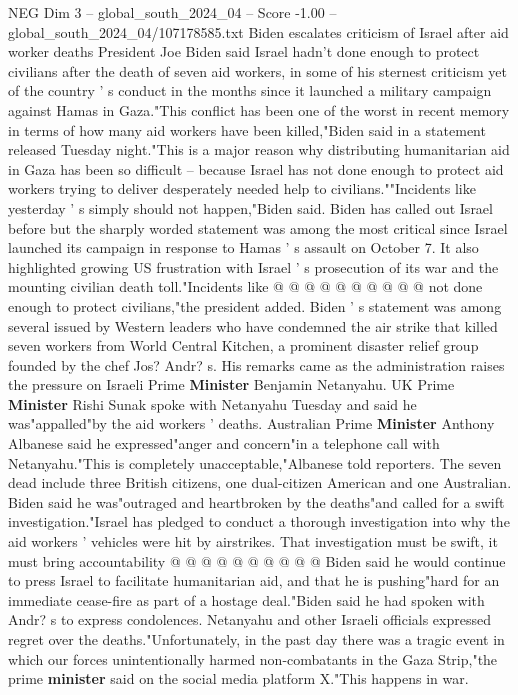 \begin{textsample}{NEG Dim 3 – global\_south\_2024\_04 – Score -1.00 – global\_south\_2024\_04/107178585.txt}  \label{ex:f3_neg_247}
Biden escalates criticism of Israel after aid worker deaths President Joe Biden said Israel hadn't done enough to protect civilians after the death of seven aid workers, in some of his sternest criticism yet of the country ' s conduct in the months since it launched a military campaign against Hamas in Gaza."This conflict has been one of the worst in recent memory in terms of how many aid workers have been killed,"Biden said in a statement released Tuesday night."This is a major reason why distributing humanitarian aid in Gaza has been so difficult -- because Israel has not done enough to protect aid workers trying to deliver desperately needed help to civilians.""Incidents like yesterday ' s simply should not happen,"Biden said.
Biden has called out Israel before but the sharply worded statement was among the most critical since Israel launched its campaign in response to Hamas ' s assault on October 7.
It also highlighted growing US frustration with Israel ' s prosecution of its war and the mounting civilian death toll."Incidents like @ @ @ @ @ @ @ @ @ @ not done enough to protect civilians,"the president added.
Biden ' s statement was among several issued by Western leaders who have condemned the air strike that killed seven workers from World Central Kitchen, a prominent disaster relief group founded by the chef Jos?
Andr? s.
His remarks came as the administration raises the pressure on Israeli Prime \textbf{Minister} Benjamin Netanyahu.
UK Prime \textbf{Minister} Rishi Sunak spoke with Netanyahu Tuesday and said he was"appalled"by the aid workers ' deaths.
Australian Prime \textbf{Minister} Anthony Albanese said he expressed"anger and concern"in a telephone call with Netanyahu."This is completely unacceptable,"Albanese told reporters.
The seven dead include three British citizens, one dual-citizen American and one Australian.
Biden said he was"outraged and heartbroken by the deaths"and called for a swift investigation."Israel has pledged to conduct a thorough investigation into why the aid workers ' vehicles were hit by airstrikes.
That investigation must be swift, it must bring accountability @ @ @ @ @ @ @ @ @ @ Biden said he would continue to press Israel to facilitate humanitarian aid, and that he is pushing"hard for an immediate cease-fire as part of a hostage deal."Biden said he had spoken with Andr? s to express condolences.
Netanyahu and other Israeli officials expressed regret over the deaths."Unfortunately, in the past day there was a tragic event in which our forces unintentionally harmed non-combatants in the Gaza Strip,"the prime \textbf{minister} said on the social media platform X."This happens in war.

\end{textsample}
